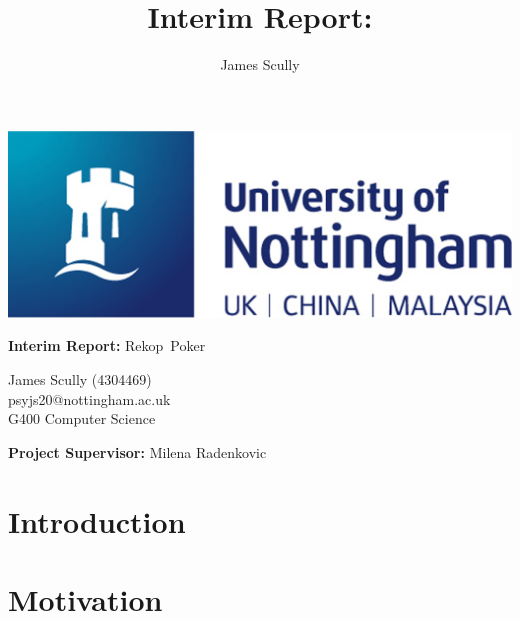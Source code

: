\documentclass[11pt]{article}
\title{Interim Report: \pt}
\author{James Scully}
\newcommand{\pn}{Rekop}
\begin{document}
{\selectfont


\hspace{0pt}

\vfill

\begin{center}
	\includegraphics[scale=0.4]{uni_logo}
	
	\vspace{1cm}
	
	{\Large \textbf{Interim Report:} \pn \ Poker} \linebreak
	
	\begin{large}
		James Scully (4304469) \\
		psyjs20@nottingham.ac.uk \\
		G400 Computer Science \\
	\end{large}
	
\end{center}

\vfill

\begin{center}
	\textbf{Project Supervisor:} Milena Radenkovic
\end{center}

\hspace{0pt}

\pagebreak


\newcommand{\entry}[1]{
	\textbf{#1} - 
}

\newcommand{\TODO}[1]{
	\textbf{{\Large \emph{#1}}}
}




\section*{Introduction}




\section*{Motivation}




}
\end{document}
